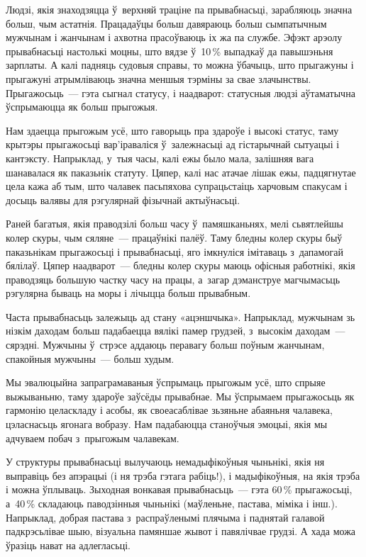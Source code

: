 Людзі, якія знаходзяцца ў~верхняй траціне па прывабнасьці, зарабляюць значна больш, чым астатнія. Працадаўцы больш давяраюць больш сымпатычным мужчынам і жанчынам і ахвотна прасоўваюць іх жа па службе. Эфэкт арэолу прывабнасьці настолькі моцны, што вядзе ў~10\,\% выпадкаў да павышэньня зарплаты. А калі падняць судовыя справы, то можна ўбачыць, што прыгажуны і прыгажуні атрымліваюць значна меншыя тэрміны за свае злачынствы. Прыгажосьць~--- гэта сыгнал статусу, і наадварот: статусныя людзі аўтаматычна ўспрымаюцца як больш прыгожыя.

Нам здаецца прыгожым усё, што гаворыць пра здароўе і высокі статус, таму крытэры прыгажосьці вар'іраваліся ў~залежнасьці ад гістарычнай сытуацыі і кантэксту. Напрыклад, у~тыя часы, калі ежы было мала, залішняя вага шанавалася як паказьнік статуту. Цяпер, калі нас атачае лішак ежы, падцягнутае цела кажа аб тым, што чалавек пасьпяхова супрацьстаіць харчовым спакусам і досыць валявы для рэгулярнай фізычнай актыўнасьці.

Раней багатыя, якія праводзілі больш часу ў~памяшканьнях, мелі сьвятлейшы колер скуры, чым сяляне~--- працаўнікі палёў. Таму бледны колер скуры быў паказьнікам прыгажосьці і прывабнасьці, яго імкнуліся імітаваць з~дапамогай бялілаў. Цяпер наадварот~--- бледны колер скуры маюць офісныя работнікі, якія праводзяць большую частку часу на працы, а~загар дэманструе магчымасьць рэгулярна бываць на моры і лічыцца больш прывабным.

Часта прывабнасьць залежыць ад стану «ацэншчыка». Напрыклад, мужчынам зь нізкім даходам больш падабаецца вялікі памер грудзей, з~высокім даходам~--- сярэдні. Мужчыны ў~стрэсе аддаюць перавагу больш поўным жанчынам, спакойныя мужчыны~--- больш худым.

Мы эвалюцыйна запраграмаваныя ўспрымаць прыгожым усё, што спрыяе выжываньню, таму здароўе заўсёды прывабнае. Мы ўспрымаем прыгажосьць як гармонію целаскладу і асобы, як своеасаблівае зьзяньне абаяньня чалавека, цэласнасьць ягонага вобразу. Нам падабаюцца станоўчыя эмоцыі, якія мы адчуваем побач з~прыгожым чалавекам.

У структуры прывабнасьці вылучаюць немадыфікоўныя чыньнікі, якія ня выправіць без апэрацыі (і ня трэба гэтага рабіць!), і мадыфікоўныя, на якія трэба і можна ўплываць. Зыходная вонкавая прывабнасьць~--- гэта 60\,\% прыгажосьці, а~40\,\% складаюць паводзінныя чыньнікі (маўленьне, пастава, міміка і інш.). Напрыклад, добрая пастава з~распраўленымі плячыма і паднятай галавой падкрэсьлівае шыю, візуальна памяншае жывот і павялічвае грудзі. А хада можа ўразіць нават на адлегласьці.

